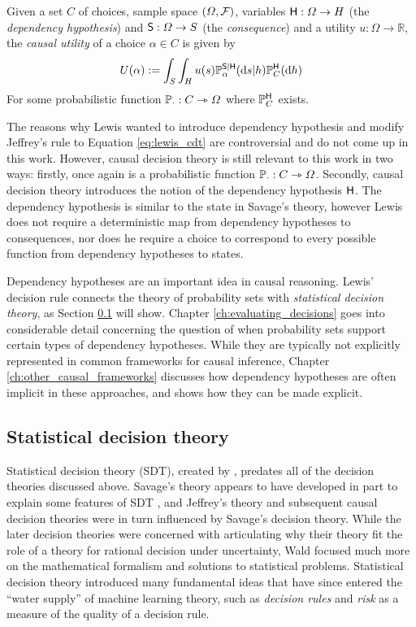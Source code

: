 \begin{definition}
Given a set $C$ of choices, sample space $(\Omega,\mathcal{F})$, variables $\mathsf{H}:\Omega\to H$ (the \emph{dependency hypothesis}) and $\mathsf{S}:\Omega\to S$ (the \emph{consequence}) and a utility $u:\Omega\to \mathbb{R}$, the \emph{causal utility} of a choice $\alpha\in C$ is given by
\begin{align}
    U(\alpha) := \int_S \int_H u(s) \mathbb{P}_\alpha^{\mathsf{S}|\mathsf{H}}(\mathrm{d}s|h) \mathbb{P}_C^{\mathsf{H}}(\mathrm{d}h)\label{eq:lewis_cdt}
\end{align}
For some probabilistic function $\mathbb{P}_\cdot:C\rightarrowtriangle \Omega$ where $\mathbb{P}_C^{\mathsf{H}}$ exists.
\end{definition}

The reasons why Lewis wanted to introduce dependency hypothesis and modify Jeffrey's rule to Equation \eqref{eq:lewis_cdt} are controversial and do not come up in this work. However, causal decision theory is still relevant to this work in two ways: firstly, once again is a probabilistic function $\mathbb{P}_\cdot:C\rightarrowtriangle \Omega$. Secondly, causal decision theory introduces the notion of the dependency hypothesis $\mathsf{H}$. The dependency hypothesis is similar to the state in Savage's theory, however Lewis does not require a deterministic map from dependency hypotheses to consequences, nor does he require a choice to correspond to every possible function from dependency hypotheses to states.

Dependency hypotheses are an important idea in causal reasoning. Lewis' decision rule connects the theory of probability sets with \emph{statistical decision theory}, as Section \ref{sec:sdt} will show. Chapter \ref{ch:evaluating_decisions} goes into considerable detail concerning the question of when probability sets support certain types of dependency hypotheses. While they are typically not explicitly represented in common frameworks for causal inference, Chapter \ref{ch:other_causal_frameworks} discusses how dependency hypotheses are often implicit in these approaches, and shows how they can be made explicit.

\subsection{Statistical decision theory}\label{sec:sdt}

Statistical decision theory (SDT), created by \citet{wald_statistical_1950}, predates all of the decision theories discussed above. Savage's theory appears to have developed in part to explain some features of SDT \citet{savage_theory_1951}, and Jeffrey's theory and subsequent causal decision theories were in turn influenced by Savage's decision theory. While the later decision theories were concerned with articulating why their theory fit the role of a theory for rational decision under uncertainty, Wald focused much more on the mathematical formalism and solutions to statistical problems. Statistical decision theory introduced many fundamental ideas that have since entered the ``water supply'' of machine learning theory, such as \emph{decision rules} and \emph{risk} as a measure of the quality of a decision rule.

